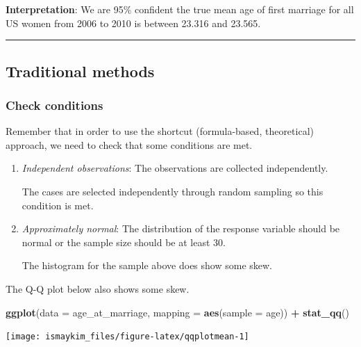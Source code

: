 \documentclass[12pt, krantz2,]{krantz}
\makeatletter
\newenvironment{Shaded}{\begin{snugshade}}{\end{snugshade}}
\newcommand{\DataTypeTok}[1]{\textcolor[rgb]{0.27,0.27,0.27}{#1}}
\newcommand{\KeywordTok}[1]{\textcolor[rgb]{0.27,0.27,0.27}{\textbf{#1}}}
\newcommand{\NormalTok}[1]{#1}
\newcommand{\OperatorTok}[1]{\textcolor[rgb]{0.43,0.43,0.43}{\textbf{#1}}}
\newcommand{\StringTok}[1]{\textcolor[rgb]{0.5,0.5,0.5}{#1}}
\newenvironment{kframe}{%
\medskip{}
\setlength{\fboxsep}{.8em}
 \def\at@end@of@kframe{}%
 \ifinner\ifhmode%
  \def\at@end@of@kframe{\end{minipage}}%
  \begin{minipage}{\columnwidth}%
 \fi\fi%
 \def\FrameCommand##1{\hskip\@totalleftmargin \hskip-\fboxsep
 \colorbox{shadecolor}{##1}\hskip-\fboxsep
     \hskip-\linewidth \hskip-\@totalleftmargin \hskip\columnwidth}%
 \MakeFramed {\advance\hsize-\width
   \@totalleftmargin\z@ \linewidth\hsize
   \@setminipage}}%
 {\par\unskip\endMakeFramed%
 \at@end@of@kframe}
\renewenvironment{Shaded}{\begin{kframe}}{\end{kframe}}
\makeatother
\begin{document}
\textbf{Interpretation}: We are 95\% confident the true mean age of first marriage for all US women from 2006 to 2010 is between 23.316 and 23.565.

\begin{center}\rule{0.5\linewidth}{\linethickness}\end{center}

\hypertarget{traditional-methods}{%
\subsection{Traditional methods}\label{traditional-methods}}

\hypertarget{check-conditions}{%
\subsubsection*{Check conditions}\label{check-conditions}}


Remember that in order to use the shortcut (formula-based, theoretical) approach, we need to check that some conditions are met.

\begin{enumerate}
\def\labelenumi{\arabic{enumi}.}
\item
  \emph{Independent observations}: The observations are collected independently.

  The cases are selected independently through random sampling so this condition is met.
\item
  \emph{Approximately normal}: The distribution of the response variable should be normal or the sample size should be at least 30.

  The histogram for the sample above does show some skew.
\end{enumerate}

The Q-Q plot below also shows some skew.

\begin{Shaded}
\begin{Highlighting}[]
\KeywordTok{ggplot}\NormalTok{(}\DataTypeTok{data =}\NormalTok{ age_at_marriage, }\DataTypeTok{mapping =} \KeywordTok{aes}\NormalTok{(}\DataTypeTok{sample =}\NormalTok{ age)) }\OperatorTok{+}
\StringTok{  }\KeywordTok{stat_qq}\NormalTok{()}
\end{Highlighting}
\end{Shaded}

\begin{center}\texttt{[image: ismaykim\_files/figure-latex/qqplotmean-1]} \end{center}
\end{document}
